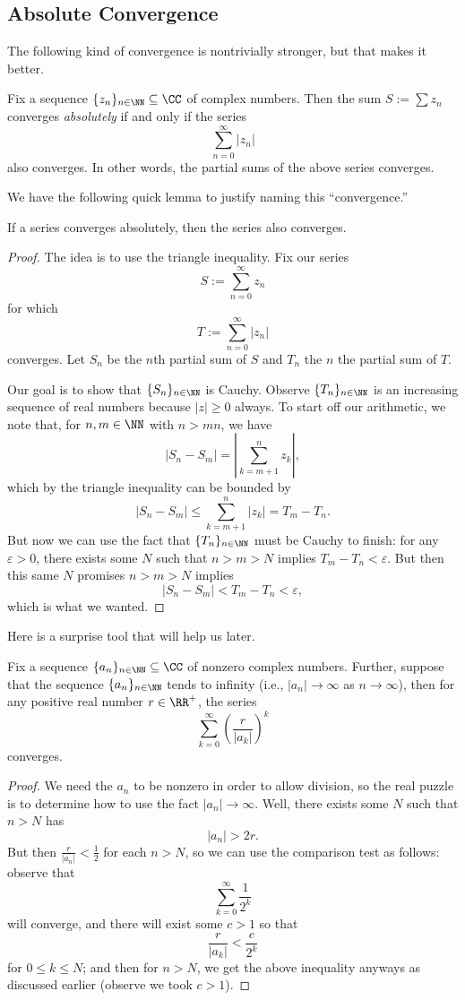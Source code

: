 \subsection{Absolute Convergence}
The following kind of convergence is nontrivially stronger, but that makes it better.
\begin{definition}
	Fix a sequence $\{z_n\}_{n\in\NN}\subseteq\CC$ of complex numbers. Then the sum $S:=\sum z_n$ converges \textit{absolutely} if and only if the series
	\[\sum_{n=0}^\infty|z_n|\]
	also converges. In other words, the partial sums of the above series converges.
\end{definition}
We have the following quick lemma to justify naming this ``convergence.''
\begin{lemma}
	If a series converges absolutely, then the series also converges.
\end{lemma}
\begin{proof}
	The idea is to use the triangle inequality. Fix our series
	\[S:=\sum_{n=0}^\infty z_n\]
	for which
	\[T:=\sum_{n=0}^\infty|z_n|\]
	converges. Let $S_n$ be the $n$th partial sum of $S$ and $T_n$ the $n$ the partial sum of $T$.
	
	Our goal is to show that $\{S_n\}_{n\in\NN}$ is Cauchy. Observe $\{T_n\}_{n\in\NN}$ is an increasing sequence of real numbers because $|z|\ge0$ always. To start off our arithmetic, we note that, for $n,m\in\NN$ with $n>mn$, we have
	\[|S_n-S_m|=\left|\sum_{k=m+1}^nz_k\right|,\]
	which by the triangle inequality can be bounded by
	\[|S_n-S_m|\le\sum_{k=m+1}^n|z_k|=T_m-T_n.\]
	But now we can use the fact that $\{T_n\}_{n\in\NN}$ must be Cauchy to finish: for any $\varepsilon>0$, there exists some $N$ such that $n>m>N$ implies $T_m-T_n<\varepsilon$. But then this same $N$ promises $n>m>N$ implies
	\[|S_n-S_m|<T_m-T_n<\varepsilon,\]
	which is what we wanted.
\end{proof}
Here is a surprise tool that will help us later.
\begin{lemma}
	Fix a sequence $\{a_n\}_{n\in\NN}\subseteq\CC$ of nonzero complex numbers. Further, suppose that the sequence $\{a_n\}_{n\in\NN}$ tends to infinity (i.e., $|a_n|\to\infty$ as $n\to\infty$), then for any positive real number $r\in\RR^+$, the series
	\[\sum_{k=0}^\infty\left(\frac r{|a_k|}\right)^k\]
	converges.
\end{lemma}
\begin{proof}
	We need the $a_n$ to be nonzero in order to allow division, so the real puzzle is to determine how to use the fact $|a_n|\to\infty$. Well, there exists some $N$ such that $n>N$ has
	\[|a_n|>2r.\]
	But then $\frac r{|a_n|}<\frac12$ for each $n>N$, so we can use the comparison test as follows: observe that
	\[\sum_{k=0}^\infty\frac1{2^k}\]
	will converge, and there will exist some $c>1$ so that
	\[\frac r{|a_k|}<\frac c{2^k}\]
	for $0\le k\le N$; and then for $n>N$, we get the above inequality anyways as discussed earlier (observe we took $c>1$).
\end{proof}
